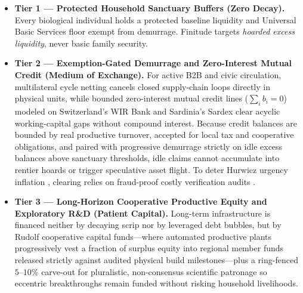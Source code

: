 \documentclass[11pt]{article}
\begin{document}
\begin{itemize}
  \item \textbf{Tier 1 --- Protected Household Sanctuary Buffers (Zero Decay).} Every biological individual holds a protected baseline liquidity and Universal Basic Services floor exempt from demurrage. Finitude targets \emph{hoarded excess liquidity}, never basic family security.
  \item \textbf{Tier 2 --- Exemption-Gated Demurrage and Zero-Interest Mutual Credit (Medium of Exchange).} For active B2B and civic circulation, multilateral cycle netting \citep{fleischman2026cycles} cancels closed supply-chain loops directly in physical units, while bounded zero-interest mutual credit lines ($\sum_i b_i = 0$) modeled on Switzerland's WIR Bank \citep{stodder2009wir} and Sardinia's Sardex \citep{iosifidis2018sardex} clear acyclic working-capital gaps without compound interest. Because credit balances are bounded by real productive turnover, accepted for local tax and cooperative obligations, and paired with progressive demurrage strictly on idle excess balances above sanctuary thresholds, idle claims cannot accumulate into rentier hoards or trigger speculative asset flight. To deter Hurwicz urgency inflation \citep{hurwicz1972decentralized}, clearing relies on fraud-proof costly verification audits \citep{perezrichet2022falsification}.
  \item \textbf{Tier 3 --- Long-Horizon Cooperative Productive Equity and Exploratory R\&D (Patient Capital).} Long-term infrastructure is financed neither by decaying scrip nor by leveraged debt bubbles, but by Rudolf \citet{meidner1978funds} cooperative capital funds---where automated productive plants progressively vest a fraction of surplus equity into regional member funds released strictly against audited physical build milestones---plus a ring-fenced $5$--$10\%$ carve-out for pluralistic, non-consensus scientific patronage so eccentric breakthroughs remain funded without risking household livelihoods.
\end{itemize}
\end{document}
